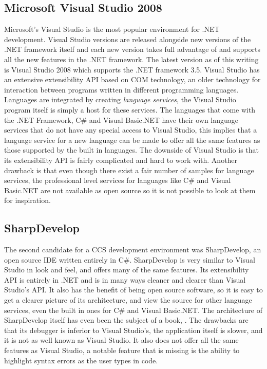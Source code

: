 	\subsection{Microsoft Visual Studio 2008}
	Microsoft's Visual Studio is the most popular environment for .NET 
	development. Visual Studio versions are released alongside new versions of 
	the .NET framework itself and each new version takes full advantage of and 
	supports all the new features in the .NET framework. The latest version as 
	of this writing is Visual Studio 2008 which supports the .NET framework 3.5. 
	Visual Studio has an extensive extensibility API based on COM technology, an 
	older technology for interaction between programs written in different 
	programming languages. Languages are integrated by creating \textit{language 
	services}, the Visual Studio program itself is simply a host for these 
	services. The languages that come with the .NET Framework, C\# and Visual 
	Basic.NET have their own language services that do not have any special 
	access to Visual Studio, this implies that a language service for a new 
	language can be made to offer all the same features as those supported by 
	the built in languages. The downside of Visual Studio is that its 
	extensibility API is fairly complicated and hard to work with. Another 
	drawback is that even though there exist a fair number of samples for 
	language services, the professional level services for languages like C\# 
	and Visual Basic.NET are not available as open source so it is not possible 
	to look at them for inspiration.
	
	\subsection{SharpDevelop}
	The second candidate for a CCS development environment was SharpDevelop, an 
	open source IDE written entirely in C\#. SharpDevelop is very similar to 
	Visual Studio in look and feel, and offers many of the same features. Its 
	extensibility API is entirely in .NET and is in many ways cleaner and 
	clearer than Visual Studio's API. It also has the benefit of being open 
	source software, so it is easy to get a clearer picture of its architecture, 
	and view the source for other language services, even the built in ones for 
	C\# and Visual Basic.NET. The architecture of SharpDevelop itself has even 
	been the subject of a book, \cite{sharpdevelop}. The drawbacks are that its 
	debugger is inferior to Visual Studio's, the application itself is slower, 
	and it is not as well known as Visual Studio. It also does not offer all the 
	same features as Visual Studio, a notable feature that is missing is the 
	ability to highlight syntax errors as the user types in code.
	
